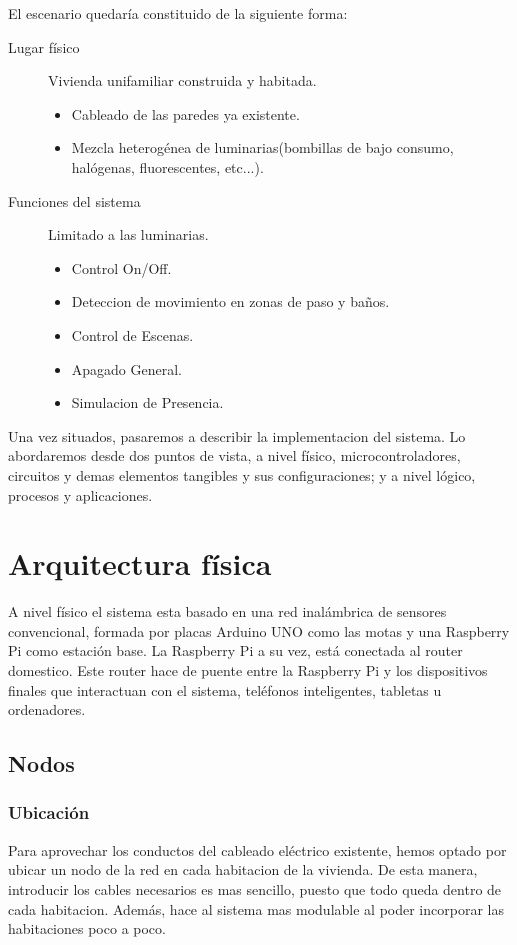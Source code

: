 El escenario quedaría constituido de la siguiente forma:
\begin{description}
    \item[Lugar físico] Vivienda unifamiliar construida y habitada.
        \begin{itemize}
            \item Cableado de las paredes ya existente.
            \item Mezcla heterogénea de luminarias(bombillas de bajo consumo, halógenas, fluorescentes, etc...).
        \end{itemize}
    \item[Funciones del sistema] Limitado a las luminarias.
        \begin{itemize}
            \item Control On/Off.
            \item Deteccion de movimiento en zonas de paso y baños.
            \item Control de Escenas.
            \item Apagado General.
            \item Simulacion de Presencia.
        \end{itemize}
\end{description}

Una vez situados, pasaremos a describir la implementacion del sistema. Lo abordaremos desde dos puntos de vista, a nivel físico, microcontroladores, circuitos y demas elementos tangibles y sus configuraciones; y a nivel lógico, procesos y aplicaciones.

 

\section{Arquitectura física}
A nivel físico el sistema esta basado en una red inalámbrica de sensores convencional, formada por placas Arduino UNO como las motas y una Raspberry Pi como estación base. La Raspberry Pi a su vez, está conectada al router domestico. Este router hace de puente entre la Raspberry Pi y los dispositivos finales que interactuan con el sistema, teléfonos inteligentes, tabletas u ordenadores.  

\subsection{Nodos}
\subsubsection{Ubicación}
Para aprovechar los conductos del cableado eléctrico existente, hemos optado por ubicar un nodo de la red en cada habitacion de la vivienda. De esta manera, introducir los cables necesarios es mas sencillo, puesto que todo queda dentro de cada habitacion. Además, hace al sistema mas modulable al poder incorporar las habitaciones poco a poco.

